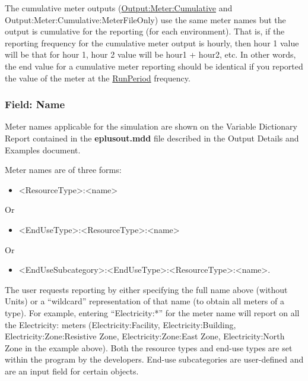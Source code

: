 The cumulative meter outputs (\hyperref[outputmetercumulative-and-outputmetercumulativemeterfileonly]{Output:Meter:Cumulative} and Output:\-Meter:\-Cumulative:\-Meter\-File\-Only) use the same meter names but the output is cumulative for the reporting (for each environment). That is, if the reporting frequency for the cumulative meter output is hourly, then hour 1 value will be that for hour 1, hour 2 value will be hour1 + hour2, etc. In other words, the end value for a cumulative meter reporting should be identical if you reported the value of the meter at the \hyperref[runperiod]{RunPeriod} frequency.

\subsubsection{Field: Name}\label{field-name-1-036}

Meter names applicable for the simulation are shown on the Variable Dictionary Report contained in the \textbf{eplusout.mdd} file described in the Output Details and Examples document.

Meter names are of three forms:

\begin{itemize}
\tightlist
\item
  \textless{}ResourceType\textgreater{}:\textless{}name\textgreater{}
\end{itemize}

Or

\begin{itemize}
\tightlist
\item
  \textless{}EndUseType\textgreater{}:\textless{}ResourceType\textgreater{}:\textless{}name\textgreater{}
\end{itemize}

Or

\begin{itemize}
\tightlist
\item
  \textless{}EndUseSubcategory\textgreater{}:\textless{}EndUseType\textgreater{}:\textless{}ResourceType\textgreater{}:\textless{}name\textgreater{}.
\end{itemize}

The user requests reporting by either specifying the full name above (without Units) or a ``wildcard'' representation of that name (to obtain all meters of a type). For example, entering ``Electricity:*'' for the meter name will report on all the Electricity: meters (Electricity:Facility, Electricity:Building, Electricity:Zone:Resistive Zone, Electricity:Zone:East Zone, Electricity:North Zone in the example above). Both the resource types and end-use types are set within the program by the developers. End-use subcategories are user-defined and are an input field for certain objects.


